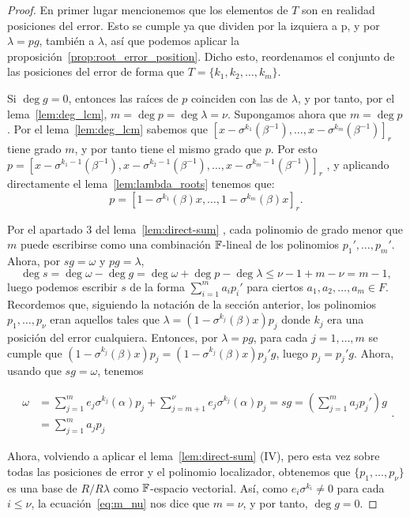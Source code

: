 \begin{proof}
    En primer lugar mencionemos que los elementos de \(T\) son en realidad posiciones del error. Esto se cumple ya que dividen por la izquiera a p, y por \(\lambda = pg\), también a \(\lambda\), así que podemos aplicar la proposición~\ref{prop:root_error_position}. Dicho esto, reordenamos el conjunto de las posiciones del error de forma que \(T = \{k_1, k_2, \ldots, k_m\}\).

    Si \(\deg g = 0\), entonces las raíces de \(p\) coinciden con las de  \(\lambda\), y por tanto, por el lema~\ref{lem:deg_lcm}, \(m = \deg p = \deg \lambda = \nu\). Supongamos ahora que \(m = \deg p\). Por el lema~\ref{lem:deg_lcm} sabemos que \( [x - \sigma^{k_1}(\beta^{-1}), \ldots, x - \sigma^{k_m}(\beta^{-1})]_r \) tiene grado \(m\), y por tanto tiene el mismo grado que \(p\). Por esto
\(
p = [x - \sigma^{k_1-1}(\beta^{-1}), x - \sigma^{k_2-1}(\beta^{-1}), \dots, x - \sigma^{k_m-1}(\beta^{-1})]_r
\)
, y aplicando directamente el lema~\ref{lem:lambda_roots} tenemos que:
    \[
    p = {[1 - \sigma^{k_1}(\beta)x, \ldots, 1 - \sigma^{k_m}(\beta)x]}_{r}
    .\]

Por el apartado 3 del lema~\ref{lem:direct-sum} , cada polinomio de grado menor que \(m\) puede escribirse como una combinación  \(\mathbb{F}\)-lineal de los polinomios  \(p_1', \ldots, p_m'\). Ahora, por \(sg = \omega\) y \(pg = \lambda\),
\[
\deg s = \deg \omega - \deg g = \deg \omega + \deg p - \deg \lambda \le \nu -1 + m - \nu = m-1
,\]
luego podemos escribir \(s\) de la forma \(\sum_{i=1}^{m} a_ip_i'\) para ciertos \(a_1, a_2, \ldots, a_m \in F\). Recordemos que, siguiendo la notación de la sección anterior, los polinomios \(p_1, \ldots, p_\nu\) eran aquellos tales que \(\lambda = (1 - \sigma^{k_j}(\beta)x)p_j\) donde \(k_j\) era una posición del error cualquiera. Entonces, por \(\lambda = pg\), para cada \(j = 1, \ldots, m\) se cumple que \((1 - \sigma ^{k_j}(\beta)x)p_j = (1 - \sigma^{k_j}(\beta)x)p_j'g\), luego \(p_j = p_j'g\). Ahora, usando que \(sg = \omega\), tenemos

\begin{equation}
\label{eq:m_nu}
\begin{aligned}
    \omega &= \sum_{j=1}^{m}e_{j}\sigma^{k_j}(\alpha)p_j + \sum_{j=m+1}^{\nu}e_{j}\sigma^{k_j}(\alpha)p_j = sg  = \left( \sum_{j=1}^{m}a_j p_j' \right) g \\
    &= \sum_{j=1}^{m} a_j p_j
\end{aligned}
.
\end{equation}

Ahora, volviendo a aplicar el lema~\ref{lem:direct-sum} (IV), pero esta vez sobre todas las posiciones de error y el polinomio localizador, obtenemos que \(\{p_1, \ldots, p_{\nu}\}\) es una base de \(R / R\lambda\) como  \(\mathbb{F}\)-espacio vectorial. Así, como \(e_i\sigma^{k_i} \neq 0\) para cada \(i \le \nu\), la ecuación~\ref{eq:m_nu} nos dice que \(m = \nu\), y por tanto, \(\deg g = 0\).
\end{proof}

